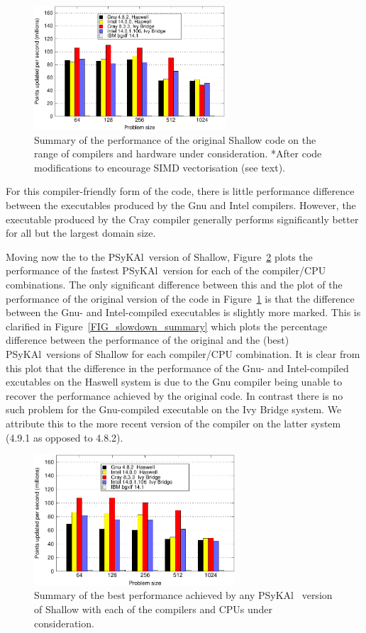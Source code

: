 \documentclass[journal]{IEEEtran}
\newcommand{\psykal}{{PS}y{KA}l\ }
\begin{document}
\begin{figure}[!t]
\centering
\includegraphics[width=2.8in]{orig_summary}
\caption{Summary of the performance of the original Shallow code on
  the range of compilers and hardware under consideration. *After code
  modifications to encourage SIMD vectorisation (see text).}
\label{FIG_orig_perf_summary}
\end{figure}

For this compiler-friendly form of the code, there is little
performance difference between the executables produced by the Gnu and
Intel compilers. However, the executable produced by the Cray compiler
generally performs significantly better for all but the largest domain
size.

Moving now the to the \psykal version of Shallow,
Figure~\ref{FIG_best_psykal_perf_summary} plots the performance of the
fastest \psykal version for each of the compiler/CPU combinations. The
only significant difference between this and the plot of the
performance of the original version of the code in
Figure~\ref{FIG_orig_perf_summary} is that the difference between the
Gnu- and Intel-compiled executables is slightly more marked. This is
clarified in Figure~\ref{FIG_slowdown_summary} which plots the
percentage difference between the performance of the original and the
(best) \psykal versions of Shallow for each compiler/CPU combination.
It is clear from this plot that the difference in the performance of
the Gnu- and Intel-compiled excutables on the Haswell system is due to
the Gnu compiler being unable to recover the performance achieved by
the original code. In contrast there is no such problem for the
Gnu-compiled executable on the Ivy Bridge system. We attribute this to
the more recent version of the compiler on the latter system (4.9.1 as
opposed to 4.8.2).

\begin{figure}[!t]
\centering
\includegraphics[width=7.5cm]{best_psykal_summary}
\caption{Summary of the best performance achieved by any \psykal 
version of Shallow with each of the compilers and CPUs under 
consideration.}
\label{FIG_best_psykal_perf_summary}
\end{figure}
\end{document}
